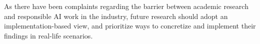 As there have been complaints regarding the barrier between academic research and responsible AI work in the industry, future research should adopt an implementation-based view, and prioritize ways to concretize and implement their findings in real-life scenarios.


